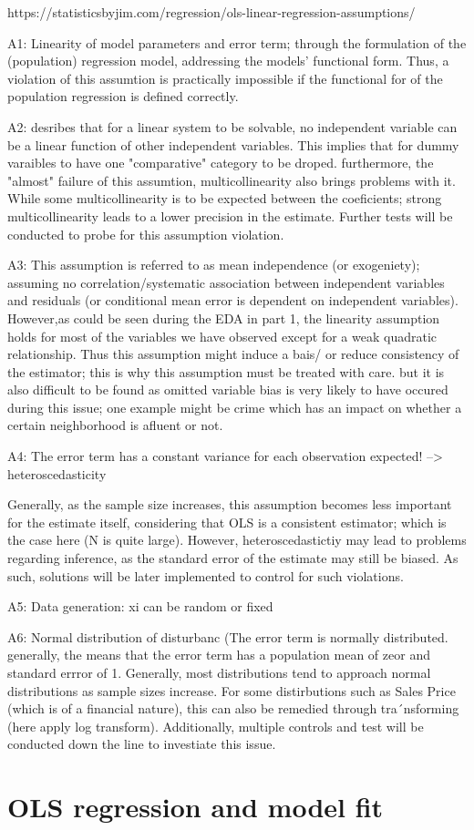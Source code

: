 \documentclass{article}
\begin{document}
https://statisticsbyjim.com/regression/ols-linear-regression-assumptions/

A1: Linearity of model parameters and error term; through the formulation of the (population) regression model, addressing the models' functional form. Thus, a violation of this assumtion is practically impossible if the functional for of the population regression is defined correctly. 

A2: desribes that for a linear system to be solvable, no independent variable can be a linear function of other independent variables. This implies that for dummy varaibles to have one "comparative" category to be droped. furthermore, the "almost" failure of this assumtion, multicollinearity also brings problems with it. While some multicollinearity is to be expected between the coeficients; strong multicollinearity leads to a lower precision in the estimate. Further tests will be conducted to probe for this assumption violation. 

A3: This assumption is referred to as mean independence (or exogeniety); assuming no correlation/systematic association between independent variables and residuals (or conditional mean error is dependent on independent variables). However,as could be seen during the EDA in part 1, the linearity assumption holds for most of the variables we have observed except for a weak quadratic relationship. 
Thus this assumption might induce a bais/ or reduce consistency of the estimator; this is why this assumption must be treated with care. but it is also difficult to be found as omitted variable bias is very likely to have occured during this issue; one example might be crime which has an impact on whether a certain neighborhood is afluent or not.

A4: The error term has a constant variance for each observation expected! --> heteroscedasticity

Generally, as the sample size increases, this assumption becomes less important for the estimate itself, considering that OLS is a consistent estimator; which is the case here (N is quite large). However, heteroscedastictiy may lead to problems regarding inference, as the standard error of the estimate may still be biased. As such, solutions will be later implemented to control for such violations.


A5: Data generation: xi can be random or fixed

A6: Normal distribution of disturbanc (The error term is normally distributed. generally, the means that the error term has a population mean of zeor and standard errror of 1. Generally, most distributions tend to approach normal distributions as sample sizes increase. For some distirbutions such as Sales Price (which is of a financial nature), this can also be remedied through tra´nsforming (here apply log transform). Additionally, multiple controls and test will be conducted down the line to investiate this issue.






\section{OLS regression and model fit}
\end{document}
